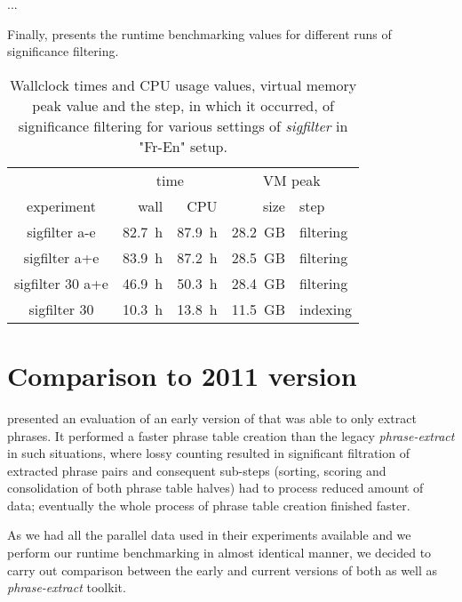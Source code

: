 ...

Finally,  presents the runtime benchmarking
values for different runs of significance filtering.

\begin{table}[ht]
\centering
\begin{tabular}{ | c | r r | r l | }
\hline
 & \multicolumn{2}{|c|}{time} & \multicolumn{2}{|c|}{VM peak} \\
experiment & wall & CPU & size & step \\
\hline
\hline
sigfilter a-e     & 82.7~h & 87.9~h & 28.2~GB & filtering \\
sigfilter a+e     & 83.9~h & 87.2~h & 28.5~GB & filtering \\
sigfilter 30 a+e  & 46.9~h & 50.3~h & 28.4~GB & filtering \\
sigfilter 30      & 10.3~h & 13.8~h & 11.5~GB & indexing \\
\hline
\end{tabular}
\caption{\label{fr-en-sigfilter-runtime-benchmarks}
Wallclock times and CPU usage values, virtual memory peak value and the step,
in which it occurred, of significance filtering for various settings of \emph{sigfilter} in "Fr-En" setup.}
\end{table}

\section{Comparison to 2011 version}
\label{sec:cu-bojar-results}

\citet{przywara:eppex} presented an evaluation of an early version of \eppex{}
that was able to only extract phrases. It performed a faster phrase
table creation than the legacy \emph{phrase-extract} in such situations,
where lossy counting resulted in significant filtration of extracted phrase
pairs and consequent sub-steps (sorting, scoring and consolidation of both
phrase table halves) had to process reduced amount of data;
eventually the whole process of phrase table creation finished faster.

As we had all the parallel data used in their experiments available and
we perform our runtime benchmarking in almost identical manner,
we decided to carry out comparison between the early and current versions of
both \eppex{} as well as \emph{phrase-extract} toolkit.

